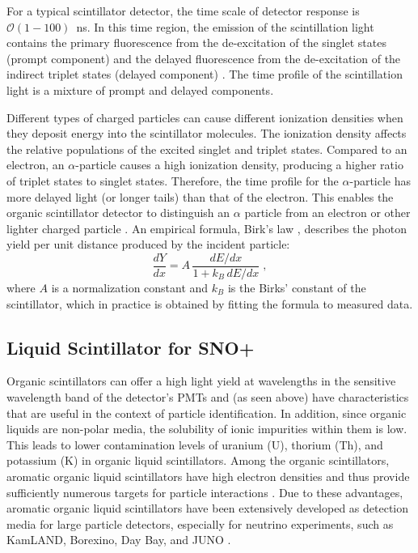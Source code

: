 For a typical scintillator detector, the time scale of detector response is $\mathcal{O}(1-100)$~ns. In this time region, the emission of the scintillation light contains the primary fluorescence from the de-excitation of the singlet states (prompt component) and the delayed fluorescence from the de-excitation of the indirect triplet states (delayed component) \cite{dunger2018topological}. The time profile of the scintillation light is a mixture of prompt and delayed components. 

Different types of charged particles can cause different ionization densities when they deposit energy into the scintillator molecules. The ionization density affects the relative populations of the excited singlet and triplet states. Compared to an electron, an $\alpha$-particle causes a high ionization density, producing a higher ratio of triplet states to singlet states. Therefore, the time profile for the $\alpha$-particle has more delayed light (or longer tails) than that of the electron. This enables the organic scintillator detector to distinguish an $\alpha$ particle from an electron or other lighter charged particle \cite{dunger2018topological, collaboration2020development}.
An empirical formula, Birk's law \cite{birks1965theory,birks1951scintillations}, describes the photon yield per unit distance produced by the incident particle:
\begin{equation}
\frac{dY}{dx}=A \, \frac{dE/dx}{1+k_B \, dE/dx} \; ,
\end{equation}
where $A$ is a normalization constant and $k_B$ is the Birks' constant of the scintillator, which in practice is obtained by fitting the formula to measured data.

\subsection{Liquid Scintillator for SNO+}\label{sect:LSproperty}

Organic scintillators can offer a high light yield at wavelengths in the sensitive wavelength band of the detector's PMTs and (as seen above) have characteristics that are useful in the context of particle identification. In addition, since organic liquids are non-polar media, the solubility of ionic impurities within them is low. This leads to lower contamination levels of uranium (U), thorium (Th), and potassium (K) in organic liquid scintillators. Among the organic scintillators, aromatic organic liquid scintillators have high electron densities and thus provide sufficiently numerous targets for particle interactions \cite{PerkinElmer}. Due to these advantages, aromatic organic liquid scintillators have been extensively developed as detection media for large particle detectors, especially for neutrino experiments, such as KamLAND, Borexino, Day Bay, and JUNO \cite{collaboration2020development}.

